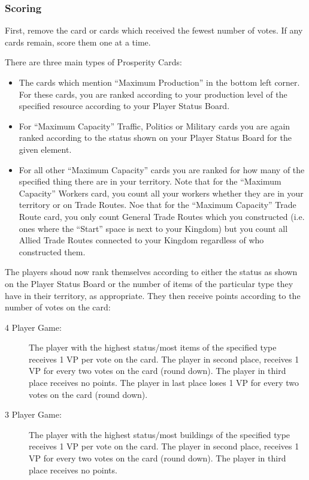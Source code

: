 \documentclass[10pt,twocolumn]{article}
\begin{document}
\subsubsection{Scoring}
First, remove the card or cards which received the fewest number of votes. If any cards remain, score them one at a time.

There are three main types of Prosperity Cards:
\begin{itemize}
\item The cards which mention ``Maximum Production'' in the bottom left corner. For these cards, you are ranked according to your production level of the specified resource according to your Player Status Board.
\item For ``Maximum Capacity'' Traffic, Politics or Military cards you are again ranked according to the status shown on your Player Status Board for the given element.
\item For all other ``Maximum Capacity'' cards you are ranked for how many of the specified thing there are in your territory. Note that for the ``Maximum Capacity'' Workers card, you count all your workers whether they are in your territory or on Trade Routes. Noe that for the ``Maximum Capacity'' Trade Route card, you only count General Trade Routes which you constructed (i.e. ones where the ``Start'' space is next to your Kingdom) but you count all Allied Trade Routes connected to your Kingdom regardless of who constructed them.
\end{itemize}
The players shoud now rank themselves according to either the status as shown on the Player Status Board or the number of items of the particular type they have in their territory, as appropriate. They then receive points according to the number of votes on the card:

\begin{description}
\item[4 Player Game:] The player with the highest status/most items of the specified type receives 1 VP per vote on the card. The player in second place, receives 1 VP for every two votes on the card (round down). The player in third place receives no points. The player in last place loses 1 VP for every two votes on the card (round down).

\item[3 Player Game:] The player with the highest status/most buildings of the specified type receives 1 VP per vote on the card. The player in second place, receives 1 VP for every two votes on the card (round down). The player in third place receives no points.
\end{description}
\end{document}
